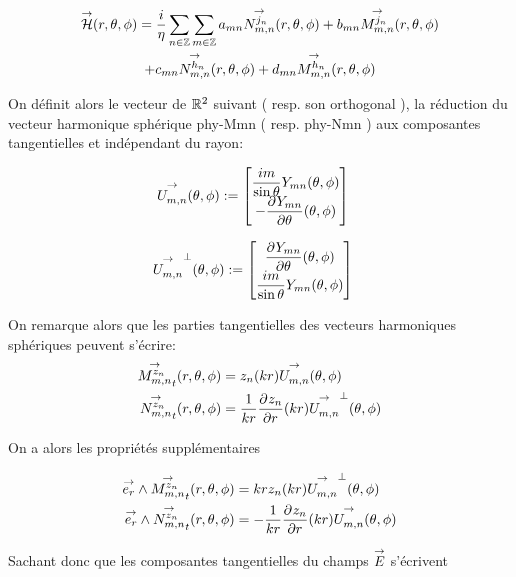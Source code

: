         \begin{multline}
            \vH(\rtp) = \frac{i}{\eta}\sum_{n\in\ZZ}\sum_{m\in\ZZ} a_{mn} \Nmn[j_n](\rtp) + b_{mn} \Mmn[j_n](\rtp)
            \\
            + c_{mn} \Nmn[h_n](\rtp) + d_{mn} \Mmn[h_n](\rtp)
        \end{multline}

        On définit alors le vecteur de \(\RR^2\) suivant ( resp. son orthogonal ), la réduction du vecteur harmonique sphérique \gls{phy-Mmn} ( resp. \gls{phy-Nmn} ) aux composantes tangentielles et indépendant du rayon:

        \begin{align}
            \label{eq:defUmn_tgt}
            \Umn(\tp) &:= 
            \begin{bmatrix}
                \frac{im}{\sin\theta}Y_{mn}(\tp)
                \\
                - \ddr{\theta}{Y_{mn}}(\tp)
            \end{bmatrix}
        \end{align}

        \begin{align}
        \label{eq:defNmn_tgt}
          \Umn^\perp(\tp) &:=
          \begin{bmatrix}
            \ddr{\theta}{Y_{mn}}(\tp)
            \\
            \frac{im}{\sin\theta}Y_{mn}(\tp)
          \end{bmatrix}
        \end{align}


        On remarque alors que les parties tangentielles des vecteurs harmoniques sphériques peuvent s'écrire:
        \begin{align}
          \Mmn[z_n]_t(\rtp) &= z_n(kr)\Umn(\tp)
          \\
          \Nmn[z_n]_t(\rtp) &= \frac{1}{kr}\ddr{r}{z_n}(kr)\Umn^\perp(\tp)
        \end{align}

        On a alors les propriétés supplémentaires
        \begin{prop}
            \label{prop:Mmn_Nmn_vect}
            \begin{align}
              \vect{e_r} \pvect \Mmn[z_n]_t(\rtp) &= krz_n(kr)\Umn^\perp(\tp)
              \\
              \vect{e_r} \pvect \Nmn[z_n]_t(\rtp) &= -\frac{1}{kr}\ddr{r}{z_n}(kr)\Umn(\tp)
            \end{align}
        \end{prop}
        Sachant donc que les composantes tangentielles du champs \(\vE\) s'écrivent

